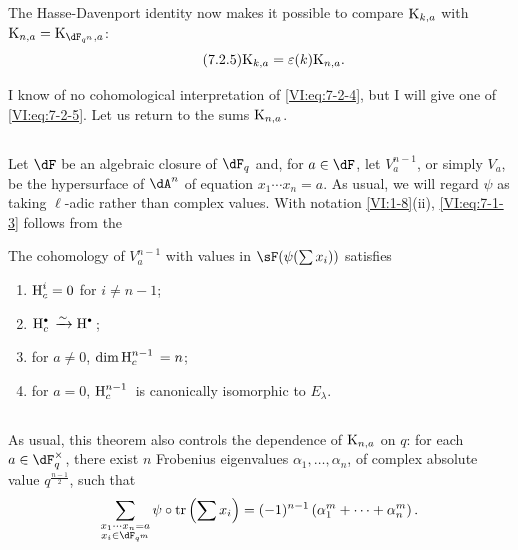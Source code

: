 The Hasse-Davenport identity now makes it possible to compare $\textnormal{K}_{k,a}$
with $\kloos_{n,a} = \kloos_{\dF_{q^n},a}$: 
\begin{equation*}\tag{7.2.5}\label{VI:eq:7-2-5}
  \textnormal{K}_{k,a} = \varepsilon(k) \textnormal{K}_{n,a} \text{.} 
\end{equation*}

I know of no cohomological interpretation of \eqref{VI:eq:7-2-4}, but
I will give one of \eqref{VI:eq:7-2-5}. Let us return to the sums $\textnormal{K}_{n,a}$. 





\subsection{}\label{VI:7-3}

Let $\dF$ be an algebraic closure of $\dF_q$ and, for $a\in \dF$, let
$V_a^{n-1}$, or simply $V_a$, be the hypersurface of $\dA^n$ of equation
$x_1 \dotsm x_n=a$. As usual, we will regard $\psi$ as taking
$\ell$-adic rather than complex values. With notation
\ref{VI:1-8}(ii), \eqref{VI:eq:7-1-3} follows from the 





\begin{theorem_}\label{VI:7-4}
The cohomology of $V_a^{n-1}$ with values in $\sF(\psi(\sum x_i))$ satisfies
\begin{enumerate}[\indent (i)]
  \item $\operatorname{H}_c^i=0$ for $i\ne n-1$;
  \item $\h_c^\bullet{} \iso \h^\bullet{}$;
  \item for $a\ne 0$, $\dim \operatorname{H}_c^{n-1}{}=n$;
  \item for $a=0$, $\operatorname{H}_c^{n-1}{}$ is canonically isomorphic to $E_\lambda$.
\end{enumerate}
\end{theorem_}





\subsection{}\label{VI:7-5}

As usual, this theorem also controls the dependence of
$\textnormal{K}_{n,a}$ on $q$: for each $a\in \dF_q^\times$, there exist $n$
Frobenius eigenvalues $\alpha_1,\dots,\alpha_n$, of complex absolute value
$q^{\frac{n-1}{2}}$, such that 
\[
  \sum_{\substack{x_1\dotsm x_n = a \\ x_i\in \dF_{q^m}}} \psi\circ \tr\left(\sum x_i\right) = (-1)^{n-1} \left(\alpha_1^m + \cdots + \alpha_n^m \right) \text{.} 
\]

